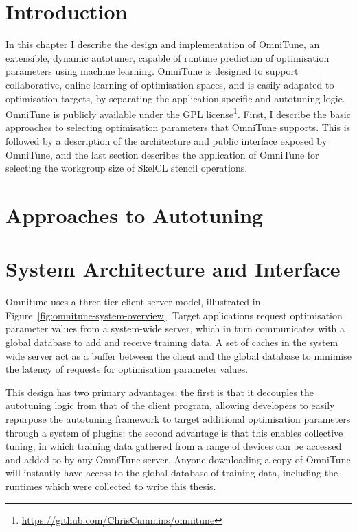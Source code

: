 \section{Introduction}


In this chapter I describe the design and implementation of OmniTune,
an extensible, dynamic autotuner, capable of runtime prediction of
optimisation parameters using machine learning. OmniTune is designed
to support collaborative, online learning of optimisation spaces, and
is easily adapated to optimisation targets, by separating the
application-specific and autotuning logic. OmniTune is publicly
available under the GPL
license\footnote{\url{https://github.com/ChrisCummins/omnitune}}. First,
I describe the basic approaches to selecting optimisation parameters
that OmniTune supports. This is followed by a description of the
architecture and public interface exposed by OmniTune, and the last
section describes the application of OmniTune for selecting the
workgroup size of SkelCL stencil operations.


\section{Approaches to Autotuning}


\section{System Architecture and Interface}


Omnitune uses a three tier client-server model, illustrated in
Figure~\ref{fig:omnitune-system-overview}. Target applications request
optimisation parameter values from a system-wide server, which in turn
communicates with a global database to add and receive training
data. A set of caches in the system wide server act as a buffer
between the client and the global database to minimise the latency of
requests for optimisation parameter values.

This design has two primary advantages: the first is that it decouples
the autotuning logic from that of the client program, allowing
developers to easily repurpose the autotuning framework to target
additional optimisation parameters through a system of plugins; the
second advantage is that this enables collective tuning, in which
training data gathered from a range of devices can be accessed and
added to by any OmniTune server. Anyone downloading a copy of OmniTune
will instantly have access to the global database of training data,
including the  runtimes which were collected to
write this thesis.

